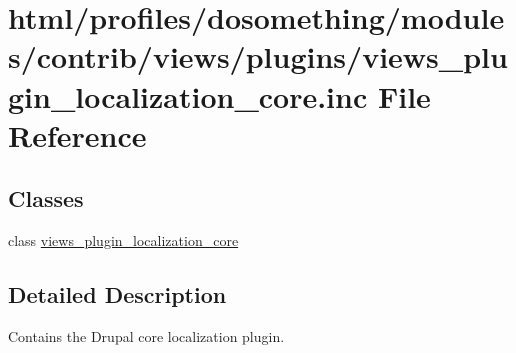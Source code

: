 \hypertarget{views__plugin__localization__core_8inc}{
\section{html/profiles/dosomething/modules/contrib/views/plugins/views\_\-plugin\_\-localization\_\-core.inc File Reference}
\label{views__plugin__localization__core_8inc}
}
\subsection*{Classes}
\begin{DoxyCompactItemize}
\item 
class \hyperlink{classviews__plugin__localization__core}{views\_\-plugin\_\-localization\_\-core}
\end{DoxyCompactItemize}


\subsection{Detailed Description}
Contains the Drupal core localization plugin. 